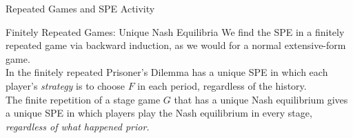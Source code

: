 \documentclass[8pt]{extarticle}
\begin{document}
  \begin{problem}{Repeated Games and SPE Activity}
    \begin{tcbraster}[raster columns = 1,colframe = black!75!white,colback=white]
    \end{tcbraster}
  \end{problem}
  \begin{problem}{Finitely Repeated Games: Unique Nash Equilibria}
    We find the SPE in a finitely repeated game via backward induction, as we would for a normal extensive-form game.\\

    In the finitely repeated Prisoner's Dilemma has a unique SPE in which each player's \textit{strategy} is to choose $F$ in each period, regardless of the history.\\

    The finite repetition of a stage game $G$ that has a unique Nash equilibrium gives a unique SPE in which players play the Nash equilibrium in every stage, \textit{regardless of what happened prior.}
  \end{problem}
\end{document}
